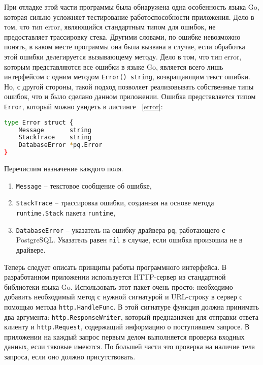 При отладке этой части программы была обнаружена одна особенность языка Go, которая
сильно усложняет тестирование работоспособности приложения. Дело в том, что тип 
error, являющийся стандартным типом для ошибок, не предоставляет трассировку стека. Другими словами, по ошибке невозможно понять,
в каком месте программы она была вызвана в случае, если обработка этой ошибки делегируется
вызывающему методу. Дело в том, что тип error, которым представляются все ошибки в языке
Go, является всего лишь интерфейсом с одним методом \texttt{Error() string}, возвращающим текст ошибки.
Но, с другой стороны, такой подход позволяет реализовывать собственные типы ошибок,
что и было сделано данном приложении. Ошибка представляется типом \texttt{Error}, который можно увидеть в листинге ~\ref{error}:

\begin{lstlisting}[language=bash, caption = {Стурктура Error.}, captionpos=b, label={error}]
type Error struct {
	Message       string
	StackTrace    string
	DatabaseError *pq.Error
}
\end{lstlisting}

Перечислим назначение каждого поля.

\begin{enumerate}
	\item \texttt{Message} -- текстовое сообщение об ошибке,
	\item \texttt{StackTrace} -- трассировка ошибки, созданная на основе метода \texttt{runtime.Stack} пакета \texttt{runtime},
	\item \texttt{DatabaseError} -- указатель на ошибку драйвера \texttt{pq}, работающего с PostgreSQL. Указатель равен \texttt{nil}
	      в случае, если ошибка произошла не в драйвере.
\end{enumerate}

Теперь следует описать принципы работы программного интерфейса. В разработанном приложении используется HTTP-сервер из стандартной
библиотеки языка Go. Использовать этот пакет очень просто: необходимо добавить необходимый метод с нужной сигнатурой и
URL-строку в сервер с помощью метода \texttt{http.HandleFunc}. В этой сигнатуре функция должна принимать два аргумента:
\texttt{http.ResponseWriter}, который предназначен для отправки ответа клиенту и \texttt{http.Request}, содержащий информацию
о поступившем запросе. В приложении на каждый запрос первым делом выполняется проверка входных данных, если таковые имеются.
По большей части это проверка на наличие тела запроса, если оно должно присутствовать.

